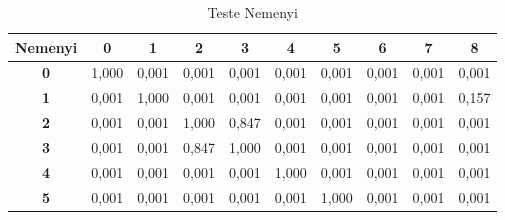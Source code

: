 \begin{table}[H]
	\centering
	\caption{Teste Nemenyi}
	\begin{tabular}{@{}clllllllll@{}}
		\toprule
		\multicolumn{1}{l}{\textbf{Nemenyi}} & \multicolumn{1}{c}{\textbf{0}} & \multicolumn{1}{c}{\textbf{1}} & \multicolumn{1}{c}{\textbf{2}} & \multicolumn{1}{c}{\textbf{3}} & \multicolumn{1}{c}{\textbf{4}} & \multicolumn{1}{c}{\textbf{5}} & \multicolumn{1}{c}{\textbf{6}} & \multicolumn{1}{c}{\textbf{7}} & \multicolumn{1}{c}{\textbf{8}} \\ \midrule
		\textbf{0}                           & 1,000                          & 0,001                          & 0,001                          & 0,001                          & 0,001                          & 0,001                          & 0,001                          & 0,001                          & 0,001                          \\
		\textbf{1}                           & 0,001                          & 1,000                          & 0,001                          & 0,001                          & 0,001                          & 0,001                          & 0,001                          & 0,001                          & 0,157                          \\
		\textbf{2}                           & 0,001                          & 0,001                          & 1,000                          & 0,847                          & 0,001                          & 0,001                          & 0,001                          & 0,001                          & 0,001                          \\
		\textbf{3}                           & 0,001                          & 0,001                          & 0,847                          & 1,000                          & 0,001                          & 0,001                          & 0,001                          & 0,001                          & 0,001                          \\
		\textbf{4}                           & 0,001                          & 0,001                          & 0,001                          & 0,001                          & 1,000                          & 0,001                          & 0,001                          & 0,001                          & 0,001                          \\
		\textbf{5}                           & 0,001                          & 0,001                          & 0,001                          & 0,001                          & 0,001                          & 1,000                          & 0,001                          & 0,001                          & 0,001                          \\

\end{tabular}
\end{table}

